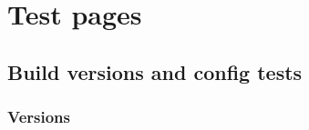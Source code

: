 \documentclass[letterpaper,table,10pt,english]{jupyterBook}
\begin{document}
\sphinxstepscope


\part{Test pages}

\sphinxstepscope


\chapter{Build versions and config tests}
\label{\detokenize{tests/build_versions_checks:build-versions-and-config-tests}}\label{\detokenize{tests/build_versions_checks::doc}}

\section{Versions}
\label{\detokenize{tests/build_versions_checks:versions}}
\end{document}
